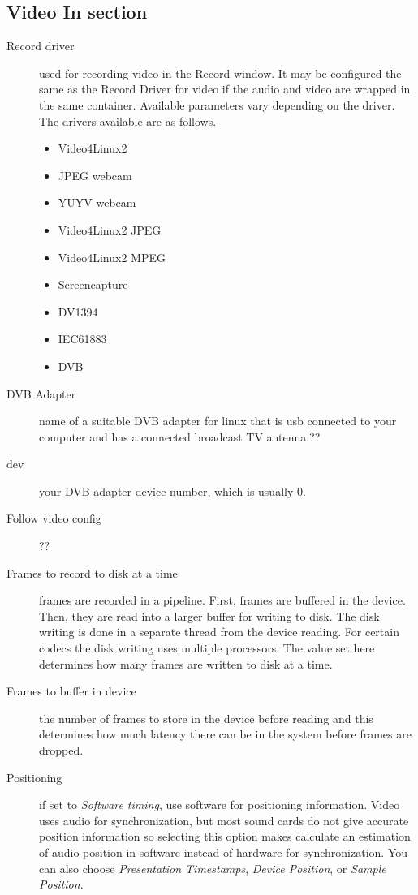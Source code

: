 \subsection{Video In section}%
\label{sub:video_in_section}

\begin{description}
    \item[Record driver]  used for recording video in the Record window. It may be configured the same as the Record Driver for video if the audio and video are wrapped in the same container. Available parameters vary depending on the driver. The drivers available are as follows.
    \begin{itemize}
        \item Video4Linux2
        \item JPEG webcam
        \item YUYV webcam
        \item Video4Linux2 JPEG
        \item Video4Linux2 MPEG
        \item Screencapture
        \item DV1394
        \item IEC61883
        \item DVB
    \end{itemize}
    \item[DVB Adapter] name of a suitable DVB adapter for linux that is usb connected to your computer and has a connected broadcast TV antenna.??
    \item[dev] your DVB adapter device number, which is usually 0.
    \item[Follow video config] ??
    \item[Frames to record to disk at a time] frames are recorded in a pipeline. First, frames are buffered in the device. Then, they are read into a larger buffer for writing to disk. The disk writing is done in a separate thread from the device reading. For certain codecs the disk writing uses multiple processors. The value set here determines how many frames are written to disk at a time.
    \item[Frames to buffer in device ] the number of frames to store in the device before reading and this determines how much latency there can be in the system before frames are dropped.
    \item[Positioning] if set to \textit{Software timing}, use software for positioning information. Video uses audio for synchronization, but most sound cards do not give accurate position information so selecting this option makes \CGG{} calculate an estimation of audio position in software instead of hardware for synchronization.  You can also choose \textit{Presentation Timestamps}, \textit{Device Position}, or \textit{Sample Position}.

\end{description}

